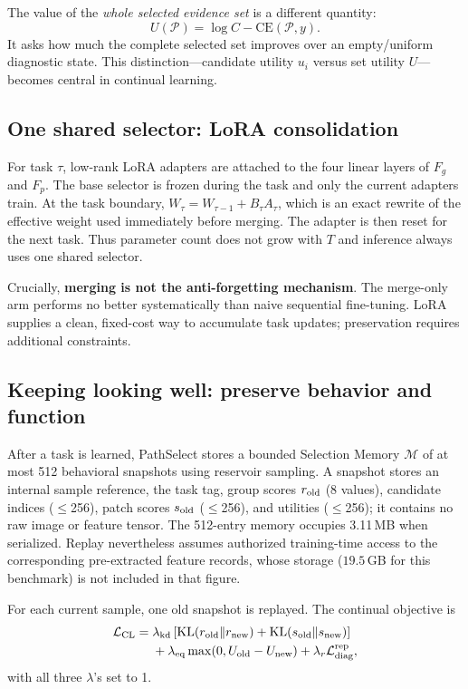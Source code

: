 \documentclass{article}
\def\L{{\cal L}}
\newcommand{\Fg}{F_g}
\newcommand{\Fp}{F_p}
\newcommand{\Psel}{\mathcal{P}}
\newcommand{\Mem}{\mathcal{M}}
\begin{document}
The value of the \emph{whole selected evidence set} is a different quantity:
\begin{equation}
U(\Psel)
=
\log C-\mathrm{CE}(\Psel,y).
\label{eq:bigU}
\end{equation}
It asks how much the complete selected set improves over an empty/uniform diagnostic state.
This distinction---candidate utility $u_i$ versus set utility $U$---becomes central in continual learning.


\subsection{One shared selector: LoRA consolidation}
\label{ssec:lora}

For task $\tau$, low-rank LoRA adapters are attached to the four linear layers of $\Fg$ and $\Fp$.
The base selector is frozen during the task and only the current adapters train.
At the task boundary, $W_{\tau}=W_{\tau-1}+B_\tau A_\tau$, which is an exact rewrite of the effective weight used immediately before merging.
The adapter is then reset for the next task.
Thus parameter count does not grow with $T$ and inference always uses one shared selector.

Crucially, \textbf{merging is not the anti-forgetting mechanism}.
The merge-only arm performs no better systematically than naive sequential fine-tuning.
LoRA supplies a clean, fixed-cost way to accumulate task updates; preservation requires additional constraints.

\subsection{Keeping looking well: preserve behavior and function}
\label{ssec:cl}

After a task is learned, PathSelect stores a bounded Selection Memory
$\Mem$ of at most 512 behavioral snapshots using reservoir sampling.
A snapshot stores an internal sample reference, the task tag, group scores $r_{\rm old}$ (8 values), candidate indices ($\le$256), patch scores $s_{\rm old}$ ($\le$256), and utilities ($\le$256); it contains no raw image or feature tensor. The 512-entry memory occupies 3.11\,MB when serialized. Replay nevertheless assumes authorized training-time access to the corresponding pre-extracted feature records, whose storage ($19.5$\,GB for this benchmark) is not included in that figure.

For each current sample, one old snapshot is replayed.
The continual objective is
\begin{align}
\L_{\mathrm{CL}}
={}&
\lambda_{\mathrm{kd}}
\left[
\mathrm{KL}(r_{\mathrm{old}}\Vert r_{\mathrm{new}})
+
\mathrm{KL}(s_{\mathrm{old}}\Vert s_{\mathrm{new}})
\right]
\nonumber\\
&+
\lambda_{\mathrm{eq}}
\max(0,U_{\mathrm{old}}-U_{\mathrm{new}})
+
\lambda_r \L_{\mathrm{diag}}^{\mathrm{rep}},
\label{eq:lcl}
\end{align}
with all three $\lambda$'s set to 1.
\end{document}
